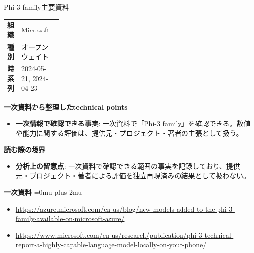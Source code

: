 \begin{technicalnote}{Phi-3 family}{主要資料}
\begingroup
\begin{tabularx}{\linewidth}{@{}>{\bfseries}p{0.22\linewidth}X@{}}
組織 & Microsoft \\
種別 & オープンウェイト \\
時系列 & 2024-05-21, 2024-04-23 \\
\end{tabularx}
\smallskip
{\bfseries 一次資料から整理したtechnical points}
\begin{itemize}[leftmargin=1.5em,itemsep=0.35em]
\item \textbf{一次情報で確認できる事実}: 一次資料で「Phi-3 family」を確認できる。数値や能力に関する評価は、提供元・プロジェクト・著者の主張として扱う。
\end{itemize}
\begin{minipage}{\linewidth}
{\bfseries 読む際の境界}
\begin{itemize}[leftmargin=1.5em,itemsep=0.35em]
\item \textbf{分析上の留意点}: 一次資料で確認できる範囲の事実を記録しており、提供元・プロジェクト・著者による評価を独立再現済みの結果として扱わない。
\end{itemize}
\begin{samepage}
{\bfseries 一次資料}
\begingroup\sloppy
\Urlmuskip=0mu plus 2mu\relax
\begin{itemize}[leftmargin=1.5em,itemsep=0.25em]
\item {\scriptsize\url{https://azure.microsoft.com/en-us/blog/new-models-added-to-the-phi-3-family-available-on-microsoft-azure/}}
\item {\scriptsize\url{https://www.microsoft.com/en-us/research/publication/phi-3-technical-report-a-highly-capable-language-model-locally-on-your-phone/}}
\end{itemize}
\endgroup
\end{samepage}
\end{minipage}
\endgroup
\end{technicalnote}
\medskip

